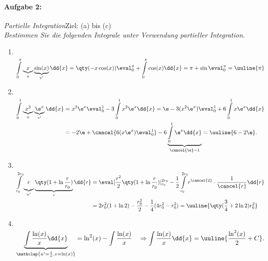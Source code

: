\paragraph{Aufgabe 2: } \emph{Partielle Integration}\hfill Ziel: (a) bis (c)\\[0.2cm]
\emph{Bestimmen Sie die folgenden Integrale unter Verwendung partieller Integration.}

\begin{enumerate}[label=(\alph*)]
    \setlength{\mathindent}{0pt}
    \item$~$\\[-1.7cm]
    \begin{align}
        \int\limits_0^\pi \underbrace{x}_{u}\underbrace{\sin(x)}_{v'}\dd{x} = \qty(-x \cos(x))\eval_0^\pi + \int\limits_{0}^{\pi} \cos(x) \dd{x} = \pi + \sin\eval_0^\pi = \uuline{\pi}
    \end{align}
    \item$~$\\[-1.7cm]
    \begin{align}
        \int\limits_0^1 \underbrace{x^3}_{u}\underbrace{\e^{x}}_{v'}\dd{x} &= x^3 \e^x \eval_0^1 - 3 \int\limits_{0}^{1} x^2 \e^x \dd{x} = \e - 3(x^2 \e^x)\eval_0^1 + 6 \int\limits_{0}^{1}x\e^x \dd{x} \\
        &= -2\e + \cancel{6(x\e^x)\eval_0^1} - 6 \underbrace{\int\limits_{0}^{1}\e^x \dd{x}}_{\cancel{\e}-1} = \uuline{6-2\e}.
    \end{align}
    \item$~$\\[-1.7cm]
    \begin{align}
        \int\limits_{r_0}^{2r_0} \underbrace{r\vphantom{\qty(\frac{1}{1})}}_{u'}\underbrace{\qty(1+\ln \frac{r}{r_0})}_{v} \dd{r} &= \eval[\frac{r^2}{2}\qty(1+\ln \frac{r}{r_0})|_{r_0}^{2r_0} - \frac{1}{2} \int\limits_{r_0}^{2r_0} r^{\cancel{2}} \cdot \frac{1}{\cancel{r}} \dd{r} \\
        &= 2 r_0^2 (1+\ln2) - \frac{r_0^2}{2} - \frac{1}{4}(4r_0^2 -r_0^2) = \uuline{\qty(\frac{3}{4}+2\ln2)r_0^2}
    \end{align}
    \item$~$\\[-1.5cm]
    \begin{align}
        \underbrace{\int \frac{\ln(x)}{x}\dd{x}}_{\mathclap{u'= \frac{1}{x}, v=\ln(x)}} = \ln^2(x) - \int \frac{\ln(x)}{x} \quad \Rightarrow \int \frac{\ln(x)}{x}\dd{x} = \uuline{\frac{\ln^2(x)}{2} + C}.
    \end{align}
\end{enumerate}

